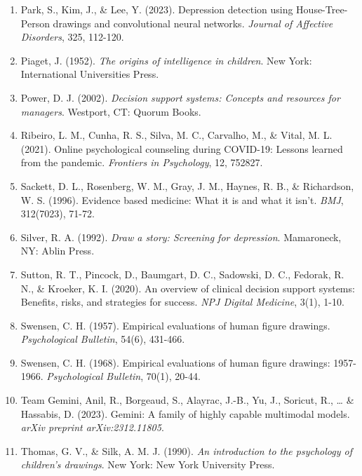 \begin{enumerate}
\item Park, S., Kim, J., \& Lee, Y. (2023). Depression detection using House-Tree-Person drawings and convolutional neural networks. \textit{Journal of Affective Disorders}, 325, 112-120.

\item Piaget, J. (1952). \textit{The origins of intelligence in children}. New York: International Universities Press.

\item Power, D. J. (2002). \textit{Decision support systems: Concepts and resources for managers}. Westport, CT: Quorum Books.

\item Ribeiro, L. M., Cunha, R. S., Silva, M. C., Carvalho, M., \& Vital, M. L. (2021). Online psychological counseling during COVID-19: Lessons learned from the pandemic. \textit{Frontiers in Psychology}, 12, 752827.

\item Sackett, D. L., Rosenberg, W. M., Gray, J. M., Haynes, R. B., \& Richardson, W. S. (1996). Evidence based medicine: What it is and what it isn't. \textit{BMJ}, 312(7023), 71-72.

\item Silver, R. A. (1992). \textit{Draw a story: Screening for depression}. Mamaroneck, NY: Ablin Press.

\item Sutton, R. T., Pincock, D., Baumgart, D. C., Sadowski, D. C., Fedorak, R. N., \& Kroeker, K. I. (2020). An overview of clinical decision support systems: Benefits, risks, and strategies for success. \textit{NPJ Digital Medicine}, 3(1), 1-10.

\item Swensen, C. H. (1957). Empirical evaluations of human figure drawings. \textit{Psychological Bulletin}, 54(6), 431-466.

\item Swensen, C. H. (1968). Empirical evaluations of human figure drawings: 1957-1966. \textit{Psychological Bulletin}, 70(1), 20-44.

\item Team Gemini, Anil, R., Borgeaud, S., Alayrac, J.-B., Yu, J., Soricut, R., \ldots{} \& Hassabis, D. (2023). Gemini: A family of highly capable multimodal models. \textit{arXiv preprint arXiv:2312.11805}.

\item Thomas, G. V., \& Silk, A. M. J. (1990). \textit{An introduction to the psychology of children's drawings}. New York: New York University Press.


\end{enumerate}
